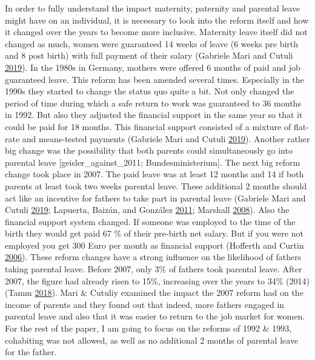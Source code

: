 \documentclass[
  12pt,
]{article}
\begin{document}
In order to fully understand the impact maternity, paternity and parental leave might have on an individual, it is necessary to look into the reform itself and how it changed over the years to become more inclusive. Maternity leave itself did not changed as much, women were guaranteed 14 weeks of leave (6 weeks pre birth and 8 post birth) with full payment of their salary (Gabriele Mari and Cutuli \protect\hyperlink{ref-gabriele_mari_parental_2019}{2019}). In the 1980s in Germany, mothers were offered 6 months of paid and job guaranteed leave. This reform has been amended several times. Especially in the 1990s they started to change the status quo quite a bit. Not only changed the period of time during which a safe return to work was guaranteed to 36 months in 1992. But also they adjusted the financial support in the same year so that it could be paid for 18 months. This financial support consisted of a mixture of flat-rate and means-tested payments (Gabriele Mari and Cutuli \protect\hyperlink{ref-gabriele_mari_parental_2019}{2019}). Another rather big change was the possibility that both parents could simultaneously go into parental leave {[}geisler\_against\_2011; Bundesministerium{]}.
The next big reform change took place in 2007. The paid leave was at least 12 months and 14 if both parents at least took two weeks parental leave. These additional 2 months should act like an incentive for fathers to take part in parental leave (Gabriele Mari and Cutuli \protect\hyperlink{ref-gabriele_mari_parental_2019}{2019}; Lapuerta, Baizán, and González \protect\hyperlink{ref-lapuerta_individual_2011}{2011}; Marshall \protect\hyperlink{ref-marshall_fathers_2008}{2008}). Also the financial support system changed. If someone was employed to the time of the birth they would get paid 67 \% of their pre-birth net salary. But if you were not employed you get 300 Euro per month as financial support (Hofferth and Curtin \protect\hyperlink{ref-hofferth_parental_2006}{2006}).
These reform changes have a strong influence on the likelihood of fathers taking parental leave. Before 2007, only 3\% of fathers took parental leave. After 2007, the figure had already risen to 15\%, increasing over the years to 34\% (2014) (Tamm \protect\hyperlink{ref-tamm_fathers_2018}{2018}).
Mari \& Cutuliy examined the impact the 2007 reform had on the income of parents and they found out that indeed, more fathers engaged in parental leave and also that it was easier to return to the job market for women.
For the rest of the paper, I am going to focus on the reforms of 1992 \& 1993, cohabiting was not allowed, as well as no additional 2 months of parental leave for the father.
\end{document}
